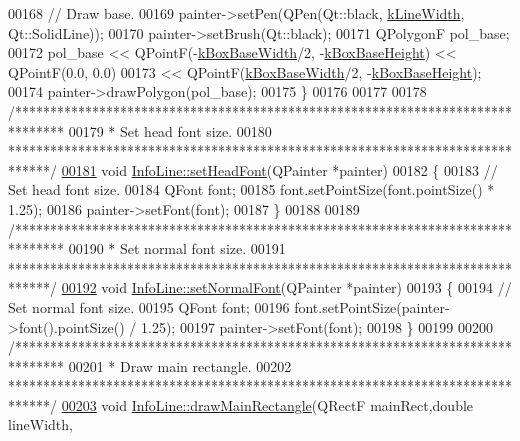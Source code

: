 \begin{DoxyCode}
00168   \textcolor{comment}{// Draw base.}
00169   painter->setPen(QPen(Qt::black, \hyperlink{class_info_line_ad072bc8ef178113c36c3d480c7d637ac}{kLineWidth}, Qt::SolidLine));
00170   painter->setBrush(Qt::black);
00171   QPolygonF pol\_base;
00172   pol\_base << QPointF(-\hyperlink{class_info_line_aad905589137b80ba75d9a1c49535eb1a}{kBoxBaseWidth}/2, -\hyperlink{class_info_line_ab50f47aa54c45def219859e9da3755e6}{kBoxBaseHeight}) << QPointF(0.0, 0.0)
00173            << QPointF(\hyperlink{class_info_line_aad905589137b80ba75d9a1c49535eb1a}{kBoxBaseWidth}/2, -\hyperlink{class_info_line_ab50f47aa54c45def219859e9da3755e6}{kBoxBaseHeight});
00174   painter->drawPolygon(pol\_base);
00175 \}
00176 
00177 
00178 \textcolor{comment}{/*******************************************************************************}
00179 \textcolor{comment}{ * Set head font size.}
00180 \textcolor{comment}{ ******************************************************************************/}
\hypertarget{infoline_8cpp_source_l00181}{}\hyperlink{class_info_line_a389ea4f5085b60d03022b94e636f11d1}{00181} \textcolor{keywordtype}{void} \hyperlink{class_info_line_a389ea4f5085b60d03022b94e636f11d1}{InfoLine::setHeadFont}(QPainter *painter)
00182 \{
00183   \textcolor{comment}{// Set head font size.}
00184   QFont font;
00185   font.setPointSize(font.pointSize() * 1.25);
00186   painter->setFont(font);
00187 \}
00188 
00189 \textcolor{comment}{/*******************************************************************************}
00190 \textcolor{comment}{ * Set normal font size.}
00191 \textcolor{comment}{ ******************************************************************************/}
\hypertarget{infoline_8cpp_source_l00192}{}\hyperlink{class_info_line_a4d5084d616c878cb717e8445db0023c1}{00192} \textcolor{keywordtype}{void} \hyperlink{class_info_line_a4d5084d616c878cb717e8445db0023c1}{InfoLine::setNormalFont}(QPainter *painter)
00193 \{
00194   \textcolor{comment}{// Set normal font size.}
00195   QFont font;
00196   font.setPointSize(painter->font().pointSize() / 1.25);
00197   painter->setFont(font);
00198 \}
00199 
00200 \textcolor{comment}{/*******************************************************************************}
00201 \textcolor{comment}{ * Draw main rectangle.}
00202 \textcolor{comment}{ ******************************************************************************/}
\hypertarget{infoline_8cpp_source_l00203}{}\hyperlink{class_info_line_a3a0f83ad98fe674513dab679e22cba42}{00203} \textcolor{keywordtype}{void} \hyperlink{class_info_line_a3a0f83ad98fe674513dab679e22cba42}{InfoLine::drawMainRectangle}(QRectF mainRect,\textcolor{keywordtype}{double} lineWidth,

\end{DoxyCode}
